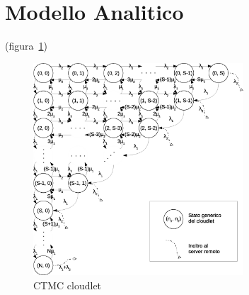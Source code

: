 \section{Modello Analitico}
(figura~\ref{ctmc})
\begin{figure}[!h]
\centering
\includegraphics[width=0.7\textwidth]{figures/ctmc}
\caption{CTMC cloudlet}
\label{ctmc}
\end{figure}
